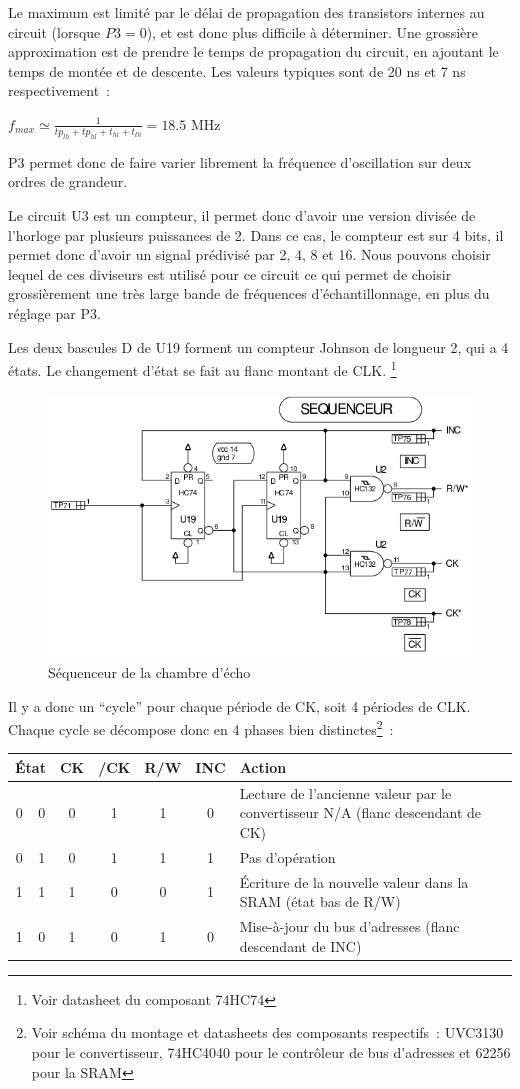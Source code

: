 \documentclass{article}
\begin{document}
Le maximum est limité par le délai de propagation des transistors internes au circuit (lorsque $P3 = 0$), et est donc plus difficile à déterminer. Une grossière approximation est de prendre le temps de propagation du circuit, en ajoutant le temps de montée et de descente. Les valeurs typiques sont de 20 ns et 7 ns respectivement~:
\begin{center}
$f_{max} \simeq \frac{1}{tp_{lh} + tp_{hl} + t_{hl} + t_{lh}} = 18.5 $ MHz
\end{center}

P3 permet donc de faire varier librement la fréquence d'oscillation sur deux ordres de grandeur.

Le circuit U3 est un compteur, il permet donc d'avoir une version divisée de l'horloge par plusieurs puissances de 2. Dans ce cas, le compteur est sur 4 bits, il permet donc d'avoir un signal prédivisé par 2, 4, 8 et 16.
Nous pouvons choisir lequel de ces diviseurs est utilisé pour ce circuit ce qui permet de choisir grossièrement une très large bande de fréquences d'échantillonnage, en plus du réglage par P3.

Les deux bascules D de U19 forment un compteur Johnson de longueur 2, qui a 4 états. Le changement d'état se fait au flanc montant de CLK. \footnote{Voir datasheet du composant 74HC74}

\begin{figure}[h]
	\centering
	\includegraphics[width = 0.5\linewidth]{shema_sequenceur_2.png}
	\caption{Séquenceur de la chambre d'écho}
	\label{fig:seq2}
\end{figure}



Il y a donc un ``cycle'' pour chaque période de CK, soit 4 périodes de CLK. Chaque cycle se décompose donc en 4 phases bien distinctes\footnote{Voir schéma du montage et datasheets des composants respectifs~: UVC3130 pour le convertisseur, 74HC4040 pour le contrôleur de bus d'adresses et 62256 pour la SRAM}~:
\begin{center}
\begin{tabular}{|c|c|c|c|c|c|l|}
\hline
\multicolumn{2}{|c|}{État} & CK & /CK & R/W & INC & Action\\
\hline
0 & 0 & 0 & 1 & 1 & 0 & Lecture de l'ancienne valeur par le convertisseur N/A (flanc descendant de CK) \\
0 & 1 & 0 & 1 & 1 & 1 & Pas d'opération\\
1 & 1 & 1 & 0 & 0 & 1 & Écriture de la nouvelle valeur dans la SRAM (état bas de R/W)\\
1 & 0 & 1 & 0 & 1 & 0 & Mise-à-jour du bus d'adresses (flanc descendant de INC)\\
\hline
\end{tabular}
\end{center}
\end{document}

